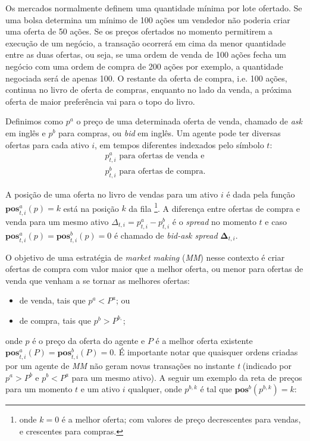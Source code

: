 Os mercados normalmente definem uma quantidade mínima por lote ofertado. Se uma bolsa determina um mínimo de 100 ações um vendedor não poderia criar uma oferta de 50 ações. Se os preços ofertados no momento permitirem a execução de um negócio, a transação ocorrerá em cima da menor quantidade entre as duas ofertas, ou seja, se uma ordem de venda de 100 ações fecha um negócio com uma ordem de compra de 200 ações por exemplo, a quantidade negociada será de apenas 100. O restante da oferta de compra, i.e. 100 ações, continua no livro de oferta de compras, enquanto no lado da venda, a próxima oferta de maior preferência vai para o topo do livro. 

Definimos como $p^{a}$ o preço de uma determinada oferta de venda, chamado de \textit{ask} em inglês e $p^{b}$ para compras, ou \textit{bid} em inglês. Um agente pode ter diversas ofertas para cada ativo $i$, em tempos diferentes indexados pelo símbolo $t$: 
\begin{equation*}
	\begin{aligned}
		p^{a}_{t, i} \text{ para ofertas de venda e}  \\
		p^{b}_{t, i} \text{ para ofertas de compra.}
	\end{aligned}
\end{equation*}

A posição de uma oferta no livro de vendas para um ativo $i$ é dada pela função $\mathbf{pos}_{t, i}^{a}(p) = k$ está na posição $k$ da fila \footnote{onde $k = 0$ é a melhor oferta; com valores de preço decrescentes para vendas, e crescentes para compras.}. A diferença entre ofertas de compra e venda para um mesmo ativo $\Delta_{t, i} = p_{t, i}^{a} - p_{t, i}^{b}$ é o \textit{spread} no momento $t$ e caso $\mathbf{pos}_{t, i}^{a}(p) = \mathbf{pos}_{t, i}^{b}(p) = 0$ é chamado de \textit{bid-ask spread} $\mathbf{\Delta}_{t, i}$.

O objetivo de uma estratégia de \textit{market making} (\textit{MM}) nesse contexto é criar ofertas de compra com valor maior que a melhor oferta, ou menor para ofertas de venda que venham a se tornar as melhores ofertas:

\begin{itemize}
    \item de venda, tais que $p^{a} < P^{a}$; ou 
    \item de compra, tais que $p^{b} > P^{b,}$;
\end{itemize}

onde $p$ é o preço da oferta do agente e $P$ é a melhor oferta existente $\mathbf{pos}_{t, i}^{a}(P) = \mathbf{pos}_{t, i}^{b}(P) = 0$.
É importante notar que quaisquer ordens criadas por um agente de \textit{MM} não geram novas transações no instante \textit{t} (indicado por $p^{a} > P^{b}$ e $p^{b} < P^{a}$ para um mesmo ativo). A seguir um exemplo da reta de preços para um momento $t$ e um ativo $i$ qualquer, onde $p^{b, k}$ é tal que $\mathbf{pos}^{b}(p^{b, k}) = k$:

